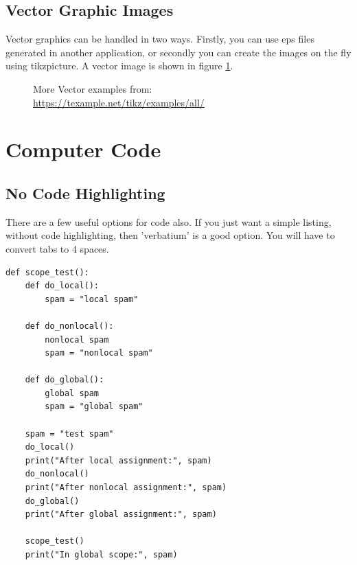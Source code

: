 \subsection{Vector Graphic Images}
Vector graphics can be handled in two ways.  Firstly, you can use eps files generated in another application, or secondly you can create the images on the fly using tikzpicture. A vector image is shown in figure \ref{fig:VennDiagram}.

\begin{figure}[ht]
	\centering
	\label{fig:VennDiagram}
	\caption{More Vector examples from: \href{https://texample.net/tikz/examples/all/}{https://texample.net/tikz/examples/all/}}
\end{figure}

\newpage
\section{Computer Code}

\subsection{No Code Highlighting}
There are a few useful options for code also.  If you just want a simple listing, without code highlighting, then 'verbatium' is a good option.  You will have to convert tabs to 4 spaces.
\begin{verbatim}
def scope_test():
    def do_local():
        spam = "local spam"
	
    def do_nonlocal():
        nonlocal spam
        spam = "nonlocal spam"
	
    def do_global():
        global spam
        spam = "global spam"
	
    spam = "test spam"
    do_local()
    print("After local assignment:", spam)
    do_nonlocal()
    print("After nonlocal assignment:", spam)
    do_global()
    print("After global assignment:", spam)
	
    scope_test()
    print("In global scope:", spam)
\end{verbatim}


